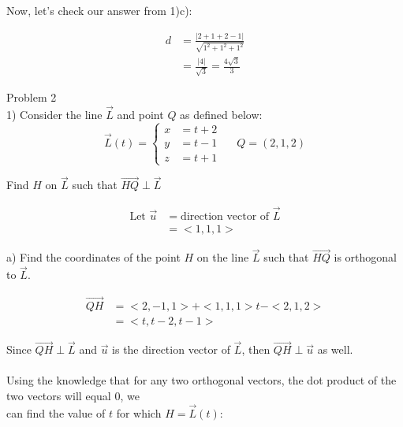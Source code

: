 \documentclass{article}
\begin{document}
\newpage

\begin{text}
\indent Now, let's check our answer from 1)c):
\end{text}

\begin{align*}
d &= \frac{| 2 + 1 + 2 - 1 |}{\sqrt{1^2 + 1^2 + 1^2}} \\
&= \frac{| 4 |}{\sqrt{3}} = \frac{4\sqrt{3}}{3}
\end{align*}



\begin{text}
Problem 2 \\

1) Consider the line $\vec{L}$ and point $Q$ as defined below:
\[\vec{L}(t) = \left\{
  \begin{array}{lr}
    x &= t + 2 \\
    y &= t - 1 \\
    z &= t + 1
  \end{array}
\right.
\;\;\;\;\;
Q = (2,1,2)
\]

\indent\indent Find $H$ on $\vec{L}$ such that $\vec{HQ} \perp \vec{L}$
\end{text}

\begin{align*}
\text{Let } \vec{u} &= \text{direction vector of } \vec{L} \\
&= <1,1,1>
\end{align*}

\begin{text}
\indent a) Find the coordinates of the point $H$ on the line $\vec{L}$ such that $\vec{HQ}$ is orthogonal to $\vec{L}$.
\end{text}

\begin{align*}
\vec{QH} &= <2, -1, 1> + <1,1,1>t - <2,1,2> \\
         &= <t, t-2, t-1>
\end{align*}

\begin{text}
\indent\indent Since $\vec{QH} \perp \vec{L}$ and $\vec{u}$ is the direction vector of $\vec{L}$, then $\vec{QH} \perp \vec{u}$ as well. \\ \\
\indent\indent\indent Using the knowledge that for any two orthogonal vectors, the dot product of the two vectors will equal $0$, we \\
\indent\indent\indent can find the value of $t$ for which $H = \vec{L}(t)$:
\end{text}
\end{document}
